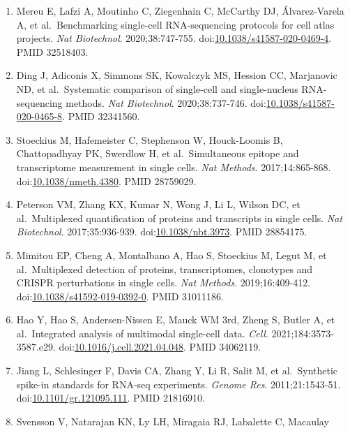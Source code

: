 \documentclass[11pt]{article}
\begin{document}
\begin{enumerate}
  al.~Massively parallel digital transcriptional profiling of single
  cells. \emph{Nat Commun}. 2017;8:14049.
  doi:\href{https://doi.org/10.1038/ncomms14049}{10.1038/ncomms14049}.
  PMID 28091601.
\item
  Mereu E, Lafzi A, Moutinho C, Ziegenhain C, McCarthy DJ,
  Álvarez-Varela A, et al.~Benchmarking single-cell RNA-sequencing
  protocols for cell atlas projects. \emph{Nat Biotechnol}.
  2020;38:747-755.
  doi:\href{https://doi.org/10.1038/s41587-020-0469-4}{10.1038/s41587-020-0469-4}.
  PMID 32518403.
\item
  Ding J, Adiconis X, Simmons SK, Kowalczyk MS, Hession CC, Marjanovic
  ND, et al.~Systematic comparison of single-cell and single-nucleus
  RNA-sequencing methods. \emph{Nat Biotechnol}. 2020;38:737-746.
  doi:\href{https://doi.org/10.1038/s41587-020-0465-8}{10.1038/s41587-020-0465-8}.
  PMID 32341560.
\item
  Stoeckius M, Hafemeister C, Stephenson W, Houck-Loomis B,
  Chattopadhyay PK, Swerdlow H, et al.~Simultaneous epitope and
  transcriptome measurement in single cells. \emph{Nat Methods}.
  2017;14:865-868.
  doi:\href{https://doi.org/10.1038/nmeth.4380}{10.1038/nmeth.4380}.
  PMID 28759029.
\item
  Peterson VM, Zhang KX, Kumar N, Wong J, Li L, Wilson DC, et
  al.~Multiplexed quantification of proteins and transcripts in single
  cells. \emph{Nat Biotechnol}. 2017;35:936-939.
  doi:\href{https://doi.org/10.1038/nbt.3973}{10.1038/nbt.3973}. PMID
  28854175.
\item
  Mimitou EP, Cheng A, Montalbano A, Hao S, Stoeckius M, Legut M, et
  al.~Multiplexed detection of proteins, transcriptomes, clonotypes and
  CRISPR perturbations in single cells. \emph{Nat Methods}.
  2019;16:409-412.
  doi:\href{https://doi.org/10.1038/s41592-019-0392-0}{10.1038/s41592-019-0392-0}.
  PMID 31011186.
\item
  Hao Y, Hao S, Andersen-Nissen E, Mauck WM 3rd, Zheng S, Butler A, et
  al.~Integrated analysis of multimodal single-cell data. \emph{Cell}.
  2021;184:3573-3587.e29.
  doi:\href{https://doi.org/10.1016/j.cell.2021.04.048}{10.1016/j.cell.2021.04.048}.
  PMID 34062119.
\item
  Jiang L, Schlesinger F, Davis CA, Zhang Y, Li R, Salit M, et
  al.~Synthetic spike-in standards for RNA-seq experiments. \emph{Genome
  Res}. 2011;21:1543-51.
  doi:\href{https://doi.org/10.1101/gr.121095.111}{10.1101/gr.121095.111}.
  PMID 21816910.
\item
  Svensson V, Natarajan KN, Ly LH, Miragaia RJ, Labalette C, Macaulay

\end{enumerate}
\end{document}
